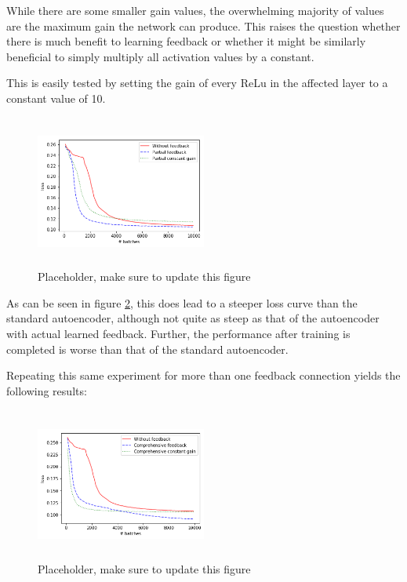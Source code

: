\documentclass{article}
\begin{document}
  While there are some smaller gain values, the overwhelming majority of values are the maximum gain the network can produce. This raises the question whether there is much benefit to learning feedback or whether it might be similarly beneficial to simply multiply all activation values by a constant. 
  
  This is easily tested by setting the gain of every ReLu in the affected layer to a constant value of 10. 
  \begin{figure}
      \centering
      \includegraphics[width=0.5\textwidth,height=5cm,keepaspectratio]{img/constgainpartial_loss.png}
      \caption{Placeholder, make sure to update this figure}
      \label{fig:contgainpartialloss}
  \end{figure}
  
  As can be seen in figure \ref{fig:contgainpartialloss}, this does lead to a steeper loss curve than the standard autoencoder, although not quite as steep as that of the autoencoder with actual learned feedback. Further, the performance after training is completed is worse than that of the standard autoencoder. 
  
  Repeating this same experiment for more than one feedback connection yields the following results: 
  
  \begin{figure}
      \centering
      \includegraphics[width=0.5\textwidth,height=5cm,keepaspectratio]{img/constgainfull_loss.png}
      \caption{Placeholder, make sure to update this figure}
      \label{fig:contgainpartialloss}
  \end{figure}
  
\end{document}

